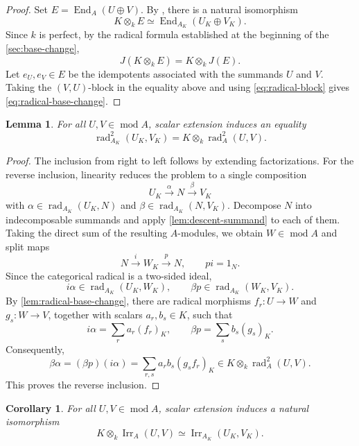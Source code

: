 \documentclass[11pt,letterpaper,reqno]{amsart}
\newtheorem{lemma}[lemma]{Lemma}
\newtheorem{corollary}[corollary]{Corollary}
\theoremstyle{definition}
\DeclareMathOperator{\End}{End}
\DeclareMathOperator{\Irr}{Irr}
\DeclareMathOperator{\rad}{rad}
\newcommand{\modcat}{\operatorname{mod}}
\begin{document}
\begin{proof}
Set $E=\End_A(U\oplus V)$.  By \cite[Lemma 2.2]{Kasjan}, there is a
natural isomorphism
\[
K\otimes_kE\simeq\End_{A_K}(U_K\oplus V_K).
\]
Since $k$ is perfect, by the radical formula established at the beginning of the \cref{sec:base-change},
\[
J(K\otimes_kE)=K\otimes_kJ(E).
\]
Let $e_U,e_V\in E$ be the idempotents associated with the summands $U$ and
$V$.  Taking the $(V,U)$-block in the equality above and using
\eqref{eq:radical-block} gives \eqref{eq:radical-base-change}.
\end{proof}

\begin{lemma}\label{lem:radical-square-base-change}
For all $U,V\in\modcat A$, scalar extension induces an equality
\begin{equation}\label{eq:radical-square-base-change}
\rad_{A_K}^2(U_K,V_K)=K\otimes_k\rad_A^2(U,V).
\end{equation}
\end{lemma}

\begin{proof}
The inclusion from right to left follows by extending factorizations.  For
the reverse inclusion, linearity reduces the problem to a single
composition
\[
U_K\xrightarrow{\alpha}N\xrightarrow{\beta}V_K
\]
with $\alpha\in\rad_{A_K}(U_K,N)$ and $\beta\in\rad_{A_K}(N,V_K)$. Decompose $N$ into indecomposable summands and apply
\cref{lem:descent-summand} to each of them.  Taking the direct sum of the
resulting $A$-modules, we obtain $W\in\modcat A$ and split maps
\[
N\xrightarrow{i}W_K\xrightarrow{p}N,
\qquad pi=1_N.
\]
Since the categorical radical is a two-sided ideal,
\[
i\alpha\in\rad_{A_K}(U_K,W_K),
\qquad
\beta p\in\rad_{A_K}(W_K,V_K).
\]
By \cref{lem:radical-base-change}, there are radical morphisms
$f_r:U\to W$ and $g_s:W\to V$, together with scalars $a_r,b_s\in K$, such
that
\[
i\alpha=\sum_r a_r(f_r)_K,
\qquad
\beta p=\sum_s b_s(g_s)_K.
\]
Consequently,
\[
\beta\alpha=(\beta p)(i\alpha)
 =\sum_{r,s}a_rb_s(g_sf_r)_K
 \in K\otimes_k\rad_A^2(U,V).
\]
This proves the reverse inclusion.
\end{proof}

\begin{corollary}\label{cor:irr-base-change}
For all $U,V\in\modcat A$, scalar extension induces a natural isomorphism
\begin{equation*}\label{eq:irr-base-change}
K\otimes_k\Irr_A(U,V)
 \simeq\Irr_{A_K}(U_K,V_K).
\end{equation*}
\end{corollary}
\end{document}
